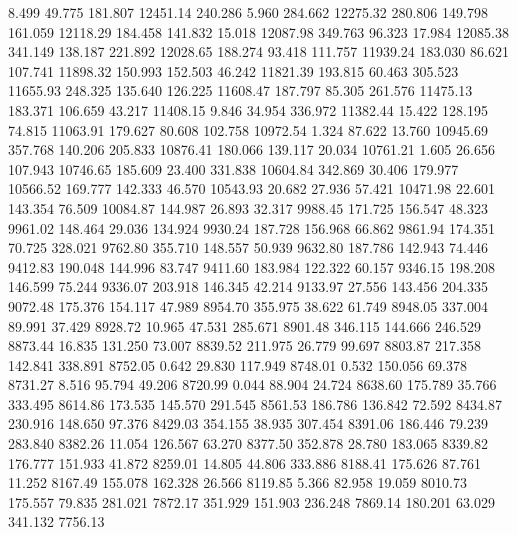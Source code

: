    8.499   49.775  181.807     12451.14
 240.286    5.960  284.662     12275.32
 280.806  149.798  161.059     12118.29
 184.458  141.832   15.018     12087.98
 349.763   96.323   17.984     12085.38
 341.149  138.187  221.892     12028.65
 188.274   93.418  111.757     11939.24
 183.030   86.621  107.741     11898.32
 150.993  152.503   46.242     11821.39
 193.815   60.463  305.523     11655.93
 248.325  135.640  126.225     11608.47
 187.797   85.305  261.576     11475.13
 183.371  106.659   43.217     11408.15
   9.846   34.954  336.972     11382.44
  15.422  128.195   74.815     11063.91
 179.627   80.608  102.758     10972.54
   1.324   87.622   13.760     10945.69
 357.768  140.206  205.833     10876.41
 180.066  139.117   20.034     10761.21
   1.605   26.656  107.943     10746.65
 185.609   23.400  331.838     10604.84
 342.869   30.406  179.977     10566.52
 169.777  142.333   46.570     10543.93
  20.682   27.936   57.421     10471.98
  22.601  143.354   76.509     10084.87
 144.987   26.893   32.317      9988.45
 171.725  156.547   48.323      9961.02
 148.464   29.036  134.924      9930.24
 187.728  156.968   66.862      9861.94
 174.351   70.725  328.021      9762.80
 355.710  148.557   50.939      9632.80
 187.786  142.943   74.446      9412.83
 190.048  144.996   83.747      9411.60
 183.984  122.322   60.157      9346.15
 198.208  146.599   75.244      9336.07
 203.918  146.345   42.214      9133.97
  27.556  143.456  204.335      9072.48
 175.376  154.117   47.989      8954.70
 355.975   38.622   61.749      8948.05
 337.004   89.991   37.429      8928.72
  10.965   47.531  285.671      8901.48
 346.115  144.666  246.529      8873.44
  16.835  131.250   73.007      8839.52
 211.975   26.779   99.697      8803.87
 217.358  142.841  338.891      8752.05
   0.642   29.830  117.949      8748.01
   0.532  150.056   69.378      8731.27
   8.516   95.794   49.206      8720.99
   0.044   88.904   24.724      8638.60
 175.789   35.766  333.495      8614.86
 173.535  145.570  291.545      8561.53
 186.786  136.842   72.592      8434.87
 230.916  148.650   97.376      8429.03
 354.155   38.935  307.454      8391.06
 186.446   79.239  283.840      8382.26
  11.054  126.567   63.270      8377.50
 352.878   28.780  183.065      8339.82
 176.777  151.933   41.872      8259.01
  14.805   44.806  333.886      8188.41
 175.626   87.761   11.252      8167.49
 155.078  162.328   26.566      8119.85
   5.366   82.958   19.059      8010.73
 175.557   79.835  281.021      7872.17
 351.929  151.903  236.248      7869.14
 180.201   63.029  341.132      7756.13
